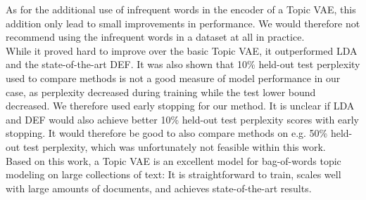 \documentclass{report}
\begin{document}
As for the additional use of infrequent words in the encoder of a Topic VAE, this addition only lead to small improvements in performance. We would therefore not recommend using the infrequent words in a dataset at all in practice. \\
While it proved hard to improve over the basic Topic VAE, it outperformed LDA and the state-of-the-art DEF. It was also shown that 10\% held-out test perplexity used to compare methods is not a good measure of model performance in our case, as perplexity decreased during training while the test lower bound decreased. We therefore used early stopping for our method. It is unclear if LDA and DEF would also achieve better 10\% held-out test perplexity scores with early stopping. It would therefore be good to also compare methods on e.g. 50\% held-out test perplexity, which was unfortunately not feasible within this work.\\
Based on this work, a Topic VAE is an excellent model for bag-of-words topic modeling on large collections of text: It is straightforward to train, scales well with large amounts of documents, and achieves state-of-the-art results. 
\end{document}
